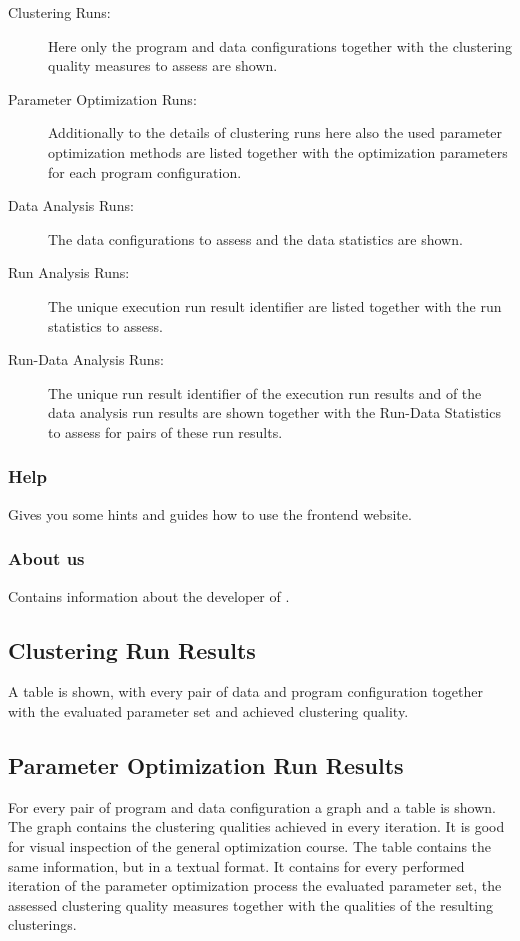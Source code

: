 \begin{description}
		\begin{description}
			\item[Clustering Runs:] Here only the program and data configurations together with the clustering quality measures to assess are shown.
			\item[Parameter Optimization Runs:] Additionally to the details of clustering runs here also the used parameter optimization methods are listed together with the optimization parameters for each program configuration.
			\item[Data Analysis Runs:] The data configurations to assess and the data statistics are shown.
			\item[Run Analysis Runs:] The unique execution run result identifier are listed together with the run statistics to assess.
			\item[Run-Data Analysis Runs:] The unique run result identifier of the execution run results and of the data analysis run results are shown together with the Run-Data Statistics to assess for pairs of these run results.
		\end{description}
	\end{description}
	\subsubsection{Help} Gives you some hints and guides how to use the frontend website.
	\subsubsection{About us} Contains information about the developer of \clusteval.
	\subsection{Clustering Run Results}
	A table is shown, with every pair of data and program configuration together with the evaluated parameter set and achieved clustering quality.
	\subsection{Parameter Optimization Run Results}
	For every pair of program and data configuration a graph and a table is shown. The graph contains the clustering qualities achieved in every iteration. It is good for visual inspection of the general optimization course. The table contains the same information, but in a textual format. It contains for every performed iteration of the parameter optimization process the evaluated parameter set, the assessed clustering quality measures together with the qualities of the resulting clusterings.
